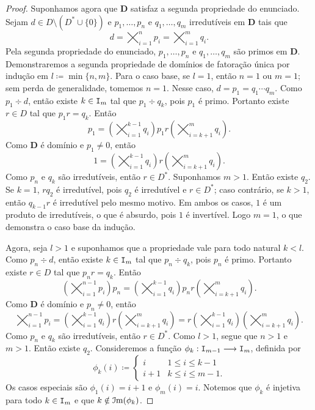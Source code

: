 \begin{proof}
	Suponhamos agora que $\bm D$ satisfaz a segunda propriedade do enunciado. Sejam $d \in D \setminus (D^* \cup \{0\})$ e $p_1,\ldots,p_n$ e $q_1,\ldots,q_m$ irredutíveis em $\bm D$ tais que
	\begin{equation*}
	d = \bigtimes_{i=1}^n p_i = \bigtimes_{i=1}^m q_i.
	\end{equation*}
Pela segunda propriedade do enunciado, $p_1,\ldots,p_n$ e $q_1,\ldots,q_m$ são primos em $\bm D$. Demonstraremos a segunda propriedade de domínios de fatoração única por indução em $l \coloneqq \min\{n,m\}$. Para o caso base, se $l=1$, então $n=1$ ou $m=1$; sem perda de generalidade, tomemos $n=1$. Nesse caso, $d=p_1=q_1 \cdots q_m$. Como $p_1 \div d$, então existe $k \in \mathtt I_m$ tal que $p_1 \div q_k$, pois $p_1$ é primo. Portanto existe $r \in D$ tal que $p_1 r = q_k$. Então
	\begin{equation*}
	p_1 = \left(\bigtimes_{i=1}^{k-1} q_i\right) p_1 r \left(\bigtimes_{i=k+1}^m q_i\right).
	\end{equation*}
Como $\bm D$ é domínio e $p_1 \neq 0$, então
	\begin{equation*}
	1 = \left(\bigtimes_{i=1}^{k-1} q_i\right) r \left(\bigtimes_{i=k+1}^m q_i\right).
	\end{equation*}
Como $p_n$ e $q_k$ são irredutíveis, então $r \in D^*$. Suponhamos $m>1$. Então existe $q_2$. Se $k=1$, $r q_2$ é irredutível, pois $q_2$ é irredutível e $r \in D^*$; caso contrário, se $k>1$, então $q_{k-1}r$ é irredutível pelo mesmo motivo. Em ambos os casos, $1$ é um produto de irredutíveis, o que é absurdo, pois $1$ é invertível. Logo $m=1$, o que demonstra o caso base da indução.

	Agora, seja $l > 1$ e suponhamos que a propriedade vale para todo natural $k<l$. Como $p_n \div d$, então existe $k \in \mathtt I_m$ tal que $p_n \div q_k$, pois $p_n$ é primo. Portanto existe $r \in D$ tal que $p_n r = q_k$. Então
\begin{equation*}
	\left(\bigtimes_{i=1}^{n-1} p_i\right) p_n = \left(\bigtimes_{i=1}^{k-1} q_i\right) p_n r \left(\bigtimes_{i=k+1}^m q_i\right).
	\end{equation*}
Como $\bm D$ é domínio e $p_n \neq 0$, então
	\begin{equation*}
	\bigtimes_{i=1}^{n-1} p_i = \left(\bigtimes_{i=1}^{k-1} q_i\right) r \left(\bigtimes_{i=k+1}^m q_i\right) = r \left(\bigtimes_{i=1}^{k-1} q_i\right)\left(\bigtimes_{i=k+1}^m q_i\right).
	\end{equation*}
Como $p_n$ e $q_k$ são irredutíveis, então $r \in D^*$. Como $l > 1$, segue que $n > 1$ e $m > 1$. Então existe $q_2$. Consideremos a função $\phi_k : \mathtt I_{m-1} \longrightarrow \mathtt I_m$, definida por
	\begin{equation*}
	\phi_k(i) \coloneqq
		\begin{cases}
		i & 1 \leq i \leq k-1 \\
		i+1 & k \leq i \leq m-1.
		\end{cases}
	\end{equation*}
Os casos especiais são $\phi_1(i)=i+1$ e $\phi_m(i)=i$. Notemos que $\phi_k$ é injetiva para todo $k \in \mathtt I_m$ e que $k \notin \mathcal{I}\mathrm{m}(\phi_k)$.


\end{proof}
